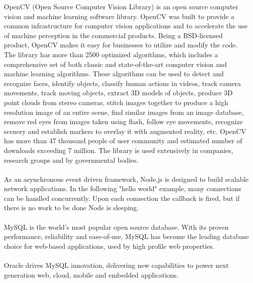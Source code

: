 \documentclass[a4paper, 12pt]{report}
\begin{document}
OpenCV (Open Source Computer Vision Library) is an open source computer vision and machine learning software library. OpenCV was built to provide a common infrastructure for
computer vision applications and to accelerate the use of machine perception in the commercial products. Being a BSD-licensed product, OpenCV makes it easy for businesses to utilize
and modify the code. The library has more than 2500 optimized algorithms, which includes a
comprehensive set of both classic and state-of-the-art computer vision and machine learning algorithms. These algorithms can be used to detect and recognize faces, identify objects, classify
human actions in videos, track camera movements, track moving objects, extract 3D models
of objects, produce 3D point clouds from stereo cameras, stitch images together to produce a
high resolution image of an entire scene, find similar images from an image database, remove
red eyes from images taken using flash, follow eye movements, recognize scenery and establish
markers to overlay it with augmented reality, etc. OpenCV has more than 47 thousand people of
user community and estimated number of downloads exceeding 7 million. The library is used
extensively in companies, research groups and by governmental bodies.\paragraph{}
As an asynchronous event driven framework, Node.js is designed to build scalable network
applications. In the following "hello world" example, many connections can be handled concurrently. Upon each connection the callback is fired, but if there is no work to be done Node is
sleeping.\paragraph{}
MySQL is the world’s most popular open source database. With its proven performance, reliability and ease-of-use, MySQL has become the leading database choice for web-based applications, used by high profile web properties.\paragraph{}
Oracle drives MySQL innovation, delivering new capabilities to power next generation web,
cloud, mobile and embedded applications.




\newpage
\end{document}
